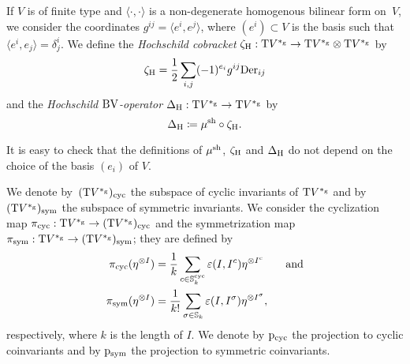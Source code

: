 \documentclass[\MainFolder/Text.tex]{subfiles}
\begin{document}
\begin{Definition}
If $V$ is of finite type and $\langle\cdot,\cdot\rangle$ is a non-degenerate homogenous bilinear form on~$V$, we consider the coordinates $g^{ij} = \langle e^i,e^j\rangle$, where $(e^i)\subset V$ is the basis such that $\langle e^i,e_j\rangle = \delta^i_j$. We define the \emph{Hochschild cobracket} $\zeta_{\mathrm{H}}: \mathrm{T} V^{*_{\mathrm{g}}} \rightarrow \mathrm{T} V^{*_{\mathrm{g}}} \otimes \mathrm{T} V^{*_{\mathrm{g}}}$ by
\begin{equation}
\zeta_{\mathrm{H}} = \frac{1}{2}\sum_{i,j} (-1)^{e_i} g^{ij} \mathrm{Der}_{ij}
\end{equation}
and the \emph{Hochschild $\mathrm{BV}$-operator} $\operatorname{\Delta}_{\mathrm{H}}: \mathrm{T} V^{*_{\mathrm{g}}} \rightarrow \mathrm{T} V^{*_{\mathrm{g}}}$ by
\begin{equation}
\operatorname{\Delta}_{\mathrm{H}} \coloneqq \mu^{\mathrm{sh}} \circ \zeta_{\mathrm{H}}.
\end{equation}
\end{Definition}

It is easy to check that the definitions of $\mu^{\mathrm{sh}}$, $\zeta_{\mathrm{H}}$ and $\operatorname{\Delta}_{\mathrm{H}}$ do not depend on the choice of the basis $(e_i)$ of $V$.

We denote by~$(\mathrm{T} V^{*_{\mathrm{g}}})_{\mathrm{cyc}}$ the subspace of cyclic invariants of $\mathrm{T} V^{*_{\mathrm{g}}}$  and by $(\mathrm{T} V^{*_{\mathrm{g}}})_{\mathrm{sym}}$ the subspace of symmetric invariants. We consider the cyclization map $\pi_{\mathrm{cyc}}: \mathrm{T} V^{*_{\mathrm{g}}} \rightarrow (\mathrm{T} V^{*_{\mathrm{g}}})_{\mathrm{cyc}}$ and the symmetrization map $\pi_{\mathrm{sym}}: \mathrm{T} V^{*_{\mathrm{g}}} \rightarrow (\mathrm{T} V^{*_{\mathrm{g}}})_{\mathrm{sym}}$; they are defined by
\begin{align*}
\pi_{\mathrm{cyc}}(\eta^{\otimes I})&= \frac{1}{k}\sum_{c\in\mathbb{S}^{\mathrm{cyc}}_k} \varepsilon(I,I^c) \eta^{\otimes I^c}\qquad\text{and}\\
\pi_{\mathrm{sym}}(\eta^{\otimes I}) &= \frac{1}{k!}\sum_{\sigma\in\mathbb{S}_k} \varepsilon(I,I^\sigma) \eta^{\otimes I^\sigma},
\end{align*}
respectively, where $k$ is the length of $I$. We denote by $\mathrm{p}_{\mathrm{cyc}}$ the projection to cyclic coinvariants and by $\mathrm{p}_{\mathrm{sym}}$ the projection to symmetric coinvariants.
\end{document}
